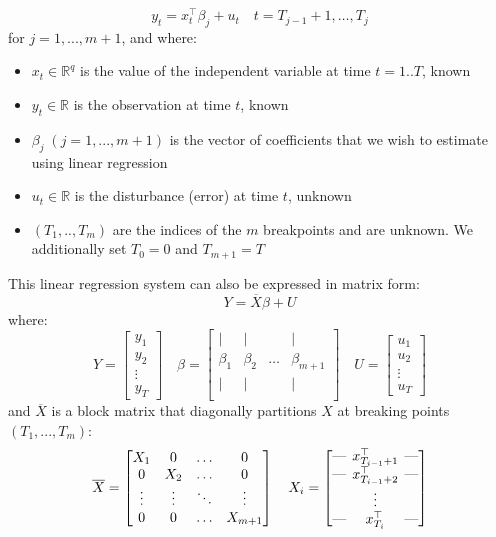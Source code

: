 \documentclass[main.tex]{subfiles}
\begin{document}
\[
y_{t} = x_{t}^{\top} \beta_{j}+u_{t} \quad t=T_{j-1}+1, \ldots, T_{j}
\]
for $j = 1,...,m+1$, and where:
\begin{itemize}
\item $x_t \in \mathbb{R}^q$ is the value of the independent variable at time
  $t = 1..T$, known
\item $y_{t} \in \mathbb{R}$ is the observation at time $t$, known
\item $\beta_j \; (j=1,...,m+1)$ is the vector of coefficients that
  we wish to estimate using linear regression 
\item $u_{t} \in \mathbb{R}$ is the disturbance (error) at time $t$, unknown
\item $(T_1,..,T_m)$ are the indices of the $m$ breakpoints and are unknown.
 We additionally set $T_0 = 0$ and $T_{m+1} = T$
\end{itemize}
This linear regression system can also be expressed in matrix form:
\[
Y = \overline{X}\beta + U
\]
where:
\[
Y =
\begin{bmatrix}
y_1 \\
y_2 \\
\vdots \\
y_T
\end{bmatrix}
\quad
\beta =
\begin{bmatrix}
\vert & \vert &  & \vert \\
\beta_{1} & \beta_{2}  & \hdots & \beta_{m+1}\\
\vert & \vert &  & \vert\\
\end{bmatrix}
\quad
U =
\begin{bmatrix}
u_1 \\
u_2 \\
\vdots \\
u_T
\end{bmatrix}
\]
and $\overline{X}$ is a block matrix that
diagonally partitions $X$ at breaking points $(T_1,..., T_m)$:
\[
\overline{X} =
\begin{bmatrix}
X_1 & 0 & \hdots & 0\\
 0 & X_2 & \hdots & 0 \\
\vdots & \vdots & \ddots & \vdots \\
 0 & 0 & \hdots & X_{m+1} 
\end{bmatrix}
\quad
X_i = 
\begin{bmatrix}
  \text{---} \hspace{-0.2cm} & x_{T_{i-1} + 1}^{\top} & \hspace{-0.2cm}\text{---} \\
  \text{---} \hspace{-0.2cm} & x_{T_{i-1} + 2}^{\top} & \hspace{-0.2cm}\text{---} \\
  & \vdots & \\ 
 \text{---} \hspace{-0.2cm} & x_{T_i}^{\top} & \hspace{-0.2cm}\text{---}  \\
\end{bmatrix}
\]
\end{document}
